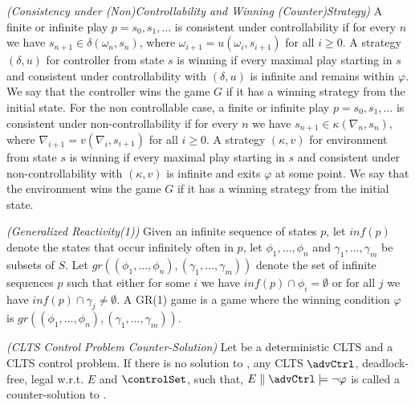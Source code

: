 \begin{definition}\label{def:consistency}\emph{(Consistency under (Non)Controllability and Winning (Counter)Strategy)}
	A finite or infinite play $p= s_0,s_1,\ldots$ is consistent under controllability if for every $n$ we have $s_{n+1} \in \delta(\omega_n,s_n)$, where $\omega_{i+1}=u(\omega_i,s_{i+1})$ for all
	$i \geq 0$. A strategy $(\delta, u)$ for controller from state $s$ is 
	winning if every maximal play starting in $s$ and consistent under controllability with $(\delta, u)$ is infinite and remains within $\varphi$.  We say that the controller wins the game $G$ if it has a winning strategy from the initial state. For the non controllable case,
	a finite or infinite play $p= s_0,s_1,\ldots$ is consistent under non-controllability if for every $n$ we have $s_{n+1} \in \kappa(\nabla_n,s_n)$, where $\nabla_{i+1}=v(\nabla_i,s_{i+1})$ for all
	$i \geq 0$. A strategy $(\kappa, v)$ for environment from state $s$ is 
	winning if every maximal play starting in $s$ and consistent under non-controllability with $(\kappa, v)$ is infinite and exits $\varphi$ at some point.  We say that the environment wins the game $G$ if it has a winning strategy from the initial state.
\end{definition}

\begin{definition}\label{def:generalized-reactivity}\emph{(Generalized Reactivity(1))}
	Given an infinite sequence of states $p$, let $inf(p)$ denote the states that occur infinitely often in $p$, let $\phi_1,\ldots,\phi_n$ and $\gamma_1,\ldots,\gamma_m$ be subsets of $S$.  Let $gr((\phi_1,\ldots,\phi_n),(\gamma_1,\ldots,\gamma_m))$ denote the set of infinite sequences $p$ such that either for some $i$ we have $inf(p) \cap \phi_i = \emptyset$ or for all $j$ we have $inf(p)\cap \gamma_j \neq \emptyset$. A GR(1) game is a game where the winning condition $\varphi$ is $gr((\phi_1,\ldots,\phi_n),(\gamma_1,\ldots,\gamma_m))$.
\end{definition}

\begin{definition}
	\label{def:clts_counter_solution} \emph{(CLTS Control Problem Counter-Solution)} 
	Let  be a deterministic CLTS and \controlProblemDef a CLTS control problem. If there is no solution to 
	\controlProblem, 
	any CLTS $\advCtrl$, deadlock-free, legal w.r.t. $E$ and $\controlSet$, such that, $E \parallel \advCtrl \models \neg\varphi$ is called a counter-solution to \controlProblem.
\end{definition}



